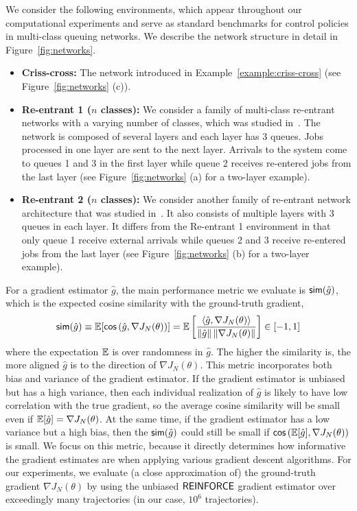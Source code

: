 We consider the following environments, which appear throughout our computational experiments and serve as standard benchmarks for control policies in multi-class queuing networks. We describe the network structure in detail in Figure~\ref{fig:networks}.
\begin{itemize}
\item {\bf Criss-cross:} The network introduced in Example~\ref{example:criss-cross} (see Figure~\ref{fig:networks} (c)).
\item {\bf Re-entrant 1 ($n$ classes):} We consider a family of multi-class re-entrant networks with a varying number of classes, which was studied in~\cite{bertsimas2014robust,dai2022queueing}. The network is composed of several layers and each layer has 3 queues. Jobs processed in one layer are sent to the next layer. Arrivals to the system come to queues 1 and 3 in the first layer while queue 2 receives re-entered jobs from the last layer (see Figure~\ref{fig:networks} (a) for a two-layer example).
\item {\bf Re-entrant 2 ($n$ classes):} We consider another family of re-entrant network architecture that was studied in~\cite{bertsimas2014robust}. It also consists of multiple layers with 3 queues in each layer. It differs from the Re-entrant 1 environment in that only queue 1 receive external arrivals while queues 2 and 3 receive re-entered jobs from the last layer (see Figure~\ref{fig:networks} (b) for a two-layer example).
\end{itemize}

For a gradient estimator $\hat{g}$, the main performance metric we evaluate is $\mathsf{sim}(\hat{g})$, which is the expected cosine similarity with the ground-truth gradient,
\begin{equation}
\label{eqn:similarity}
\mathsf{sim}(\hat{g}) \equiv \mathbb{E}[\mathsf{cos} \left( \hat{g}, \nabla J_{N}(\theta) \right)] = \mathbb{E} \left[ \frac{ \langle \hat{g}, \nabla J_{N}(\theta) \rangle}{\left\|{\hat{g}}\right\| \left\|{ \nabla J_{N}(\theta)}\right\|} \right] \in [-1,1]
\end{equation}
where the expectation $\mathbb{E}$ is over randomness in $\hat{g}$. The higher the similarity is, the more aligned $\hat{g}$ is to the direction of $\nabla J_{N}(\theta)$. This metric incorporates both bias and variance of the gradient estimator. If the gradient estimator is unbiased but has a high variance, then each individual realization of $\hat{g}$ is likely to have low correlation with the true gradient, so the average cosine similarity will be small even if $\mathbb{E}[\hat{g}]=\nabla J_{N}(\theta)$. At the same time, if the gradient estimator has a low variance but a high bias, then the $\mathsf{sim}(\hat{g})$ could still be small if $\mathsf{cos} \left(\mathbb{E}[\hat{g}], \nabla J_{N}(\theta) \right)$ is small. We focus on this metric, because it directly determines how informative the gradient estimates are when applying various gradient descent algorithms.  
For our experiments, we evaluate (a close approximation of) the ground-truth gradient $\nabla J_{N}(\theta)$
by using the unbiased $\mathsf{REINFORCE}$ gradient estimator over exceedingly many trajectories (in our case, $10^{6}$ trajectories). 

